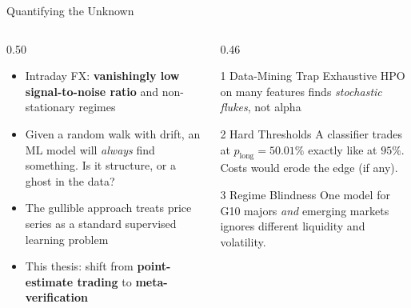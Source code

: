 \documentclass[aspectratio=169, 11pt]{beamer}
\newcommand{\hl}[1]{\textcolor{unibored}{\textbf{#1}}}
\begin{document}
\begin{frame}{Quantifying the Unknown}
  \begin{columns}[c,onlytextwidth]
    \begin{column}{0.50\textwidth}
      \begin{itemize}
        \setlength{\itemsep}{2.5mm}
        \item Intraday FX: \hl{vanishingly low signal-to-noise ratio} and non-stationary regimes
        \item Given a random walk with drift, an ML model will \emph{always} find something. Is it structure, or a ghost in the data?
        \item The gullible approach treats price series as a standard supervised learning problem
        \item This thesis: shift from \hl{point-estimate trading} to \hl{meta-verification}
      \end{itemize}
    \end{column}
    \begin{column}{0.46\textwidth}
      \footnotesize
      \begin{block}{1 \; Data-Mining Trap}
        Exhaustive HPO on many features finds \emph{stochastic flukes}, not alpha
      \end{block}
      \vspace{0.5mm}
      \begin{block}{2 \; Hard Thresholds}
        A classifier trades at $p_{\text{long}} = 50.01\%$ exactly like at $95\%$. Costs would erode the edge (if any).
      \end{block}
      \vspace{0.5mm}
      \begin{block}{3 \; Regime Blindness}
        One model for G10 majors \emph{and} emerging markets ignores different liquidity and volatility.
      \end{block}
    \end{column}
  \end{columns}
\end{frame}
\end{document}
